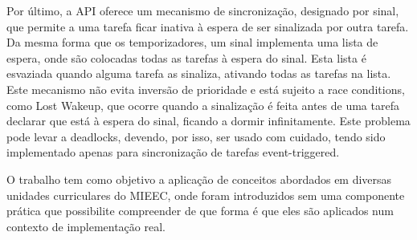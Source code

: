 \documentclass[journal]{IEEEtran}
\begin{document}
Por último, a API oferece um mecanismo de sincronização, designado por sinal, que permite a uma tarefa ficar inativa à espera de ser sinalizada por outra tarefa.
Da mesma forma que os temporizadores, um sinal implementa uma lista de espera, onde são colocadas todas as tarefas à espera do sinal.
Esta lista é esvaziada quando alguma tarefa as sinaliza, ativando todas as tarefas na lista.
Este mecanismo não evita inversão de prioridade e está sujeito a race conditions, como Lost Wakeup, que ocorre quando a sinalização é feita antes de uma tarefa declarar
que está à espera do sinal, ficando a dormir infinitamente.
Este problema pode levar a deadlocks, devendo, por isso, ser usado com cuidado, tendo sido implementado apenas para sincronização de tarefas event-triggered.

O trabalho tem como objetivo a aplicação de conceitos abordados em diversas unidades curriculares do MIEEC, onde foram introduzidos sem uma componente prática que
possibilite compreender de que forma é que eles são aplicados num contexto de implementação real.





%
%
\end{document}
